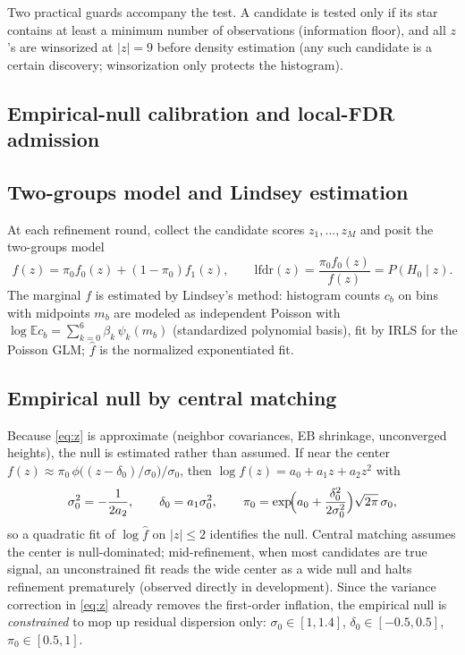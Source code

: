 \documentclass[11pt]{article}
\newcommand{\E}{\mathbb{E}}
\newcommand{\lfdr}{\mathrm{lfdr}}
\begin{document}
Two practical guards accompany the test. A candidate is tested only if its star
contains at least a minimum number of observations (information floor), and all $z$'s
are winsorized at $|z|=9$ before density estimation (any such candidate is a certain
discovery; winsorization only protects the histogram).

\subsection{Empirical-null calibration and local-FDR admission}\label{sec:lfdr}

\subsection{Two-groups model and Lindsey estimation}
At each refinement round, collect the candidate scores $z_1,\dots,z_M$ and posit the
two-groups model \cite{efron2004,efron2008}
\[
f(z)=\pi_0 f_0(z)+(1-\pi_0)f_1(z),\qquad
\lfdr(z)=\frac{\pi_0 f_0(z)}{f(z)}=P(H_0\mid z).
\]
The marginal $f$ is estimated by Lindsey's method: histogram counts $c_b$ on bins with
midpoints $m_b$ are modeled as independent Poisson with
$\log \E c_b=\sum_{k=0}^{6}\beta_k\,\psi_k(m_b)$ (standardized polynomial basis), fit by
IRLS for the Poisson GLM; $\hat f$ is the normalized exponentiated fit.

\subsection{Empirical null by central matching}
Because \eqref{eq:z} is approximate (neighbor covariances, EB shrinkage, unconverged
heights), the null is estimated rather than assumed. If near the center
$f(z)\approx \pi_0\,\phi\!\bigl((z-\delta_0)/\sigma_0\bigr)/\sigma_0$, then
$\log f(z)=a_0+a_1z+a_2z^2$ with
\begin{equation}\label{eq:centralmatch}
\sigma_0^2=-\frac{1}{2a_2},\qquad
\delta_0=a_1\sigma_0^2,\qquad
\pi_0=\exp\!\Bigl(a_0+\frac{\delta_0^2}{2\sigma_0^2}\Bigr)\sqrt{2\pi}\,\sigma_0 ,
\end{equation}
so a quadratic fit of $\log\hat f$ on $|z|\le 2$ identifies the null. Central matching
assumes the center is null-dominated; mid-refinement, when most candidates are true
signal, an unconstrained fit reads the wide center as a wide null and halts refinement
prematurely (observed directly in development). Since the variance correction in
\eqref{eq:z} already removes the first-order inflation, the empirical null is
\emph{constrained} to mop up residual dispersion only:
$\sigma_0\in[1,1.4]$, $\delta_0\in[-0.5,0.5]$, $\pi_0\in[0.5,1]$.
\end{document}
